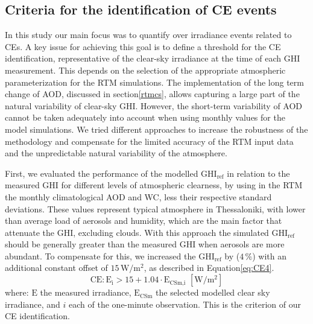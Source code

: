 \documentclass[preprint, 5p,
authoryear]{elsarticle} %
\begin{document}
\hypertarget{criteria-for-the-identification-of-ce-events}{%
\subsection{Criteria for the identification of CE
events}\label{criteria-for-the-identification-of-ce-events}}

In this study our main focus was to quantify over irradiance events
related to CEs. A key issue for achieving this goal is to define a
threshold for the CE identification, representative of the clear-sky
irradiance at the time of each GHI measurement. This depends on the
selection of the appropriate atmospheric parameterization for the RTM
simulations. The implementation of the long term change of AOD,
discussed in section\nobreakspace{}\ref{rtmcs}, allows capturing a large
part of the natural variability of clear-sky GHI. However, the
short-term variability of AOD cannot be taken adequately into account
when using monthly values for the model simulations. We tried different
approaches to increase the robustness of the methodology and compensate
for the limited accuracy of the RTM input data and the unpredictable
natural variability of the atmosphere.

First, we evaluated the performance of the modelled
\(\text{GHI}_\text{ref}\) in relation to the measured GHI for different
levels of atmospheric clearness, by using in the RTM the monthly
climatological AOD and WC, less their respective standard deviations.
These values represent typical atmosphere in Thessaloniki, with lower
than average load of aerosols and humidity, which are the main factor
that attenuate the GHI, excluding clouds. With this approach the
simulated \(\text{GHI}_\text{ref}\) should be generally greater than the
measured GHI when aerosols are more abundant. To compensate for this, we
increased the \(\text{GHI}_\text{ref}\) by (\(4\,\%\)) with an
additional constant offset of \(15\,\text{W}/\text{m}^2\), as described
in Equation\nobreakspace\ref{eq:CE4}. \begin{equation}
\text{CE} : \text{E}_\text{i} > 15 + 1.04 \cdot \text{E}_\text{CSm,i} \,\,[\text{W}/\text{m}^2] \label{eq:CE4}
\end{equation} where: \(\text{E}\) the measured irradiance,
\(\text{E}_\text{CSm}\) the selected modelled clear sky irradiance, and
\(i\) each of the one-minute observation. This is the criterion of our
CE identification.
\end{document}
